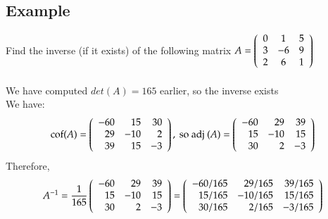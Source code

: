 \documentclass{article}[18pt]
\begin{document}
\subsection{Example}
Find the inverse (if it exists) of the following matrix $A = \left( \begin{array} { c c c } { 0 } & { 1 } & { 5 } \\ { 3 } & { - 6 } & { 9 } \\ { 2 } & { 6 } & { 1 } \end{array} \right)$\\
\\
We have computed $det(A)=165$ earlier, so the inverse exists\\
We have:
$$\operatorname { cof } ( A ) = \left( \begin{array} { r r r } { - 60 } & { 15 } & { 30 } \\ { 29 } & { - 10 } & { 2 } \\ { 39 } & { 15 } & { - 3 } \end{array} \right) , \text { so adj } ( A ) = \left( \begin{array} { r r r } { - 60 } & { 29 } & { 39 } \\ { 15 } & { - 10 } & { 15 } \\ { 30 } & { 2 } & { - 3 } \end{array} \right)$$
Therefore,
$$A ^ { - 1 } = \frac { 1 } { 165 } \left( \begin{array} { r r r } { - 60 } & { 29 } & { 39 } \\ { 15 } & { - 10 } & { 15 } \\ { 30 } & { 2 } & { - 3 } \end{array} \right) = \left( \begin{array} { r r r } { - 60 / 165 } & { 29 / 165 } & { 39 / 165 } \\ { 15 / 165 } & { - 10 / 165 } & { 15 / 165 } \\ { 30 / 165 } & { 2 / 165 } & { - 3 / 165 } \end{array} \right)$$
\end{document}
